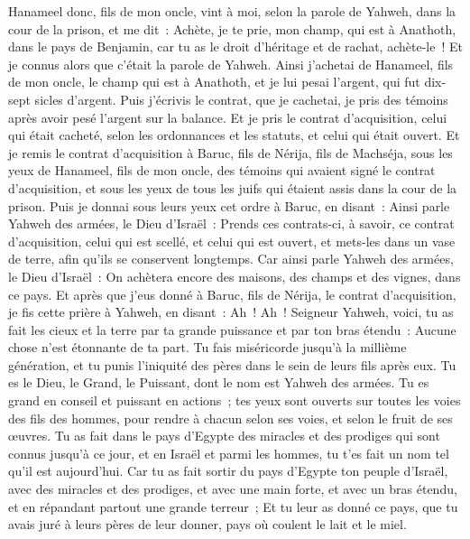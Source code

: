 \begin{multicols}{2}
Hanameel donc, fils de mon oncle, vint à moi, selon la parole de Yahweh, dans la cour de la prison, et me dit~: Achète, je te prie, mon champ, qui est à Anathoth, dans le pays de Benjamin, car tu as le droit d'héritage et de rachat, achète-le~! Et je connus alors que c'était la parole de Yahweh.
Ainsi j'achetai de Hanameel, fils de mon oncle, le champ qui est à Anathoth, et je lui pesai l'argent, qui fut dix-sept sicles d'argent.
Puis j'écrivis le contrat, que je cachetai, je pris des témoins après avoir pesé l'argent sur la balance.
Et je pris le contrat d'acquisition, celui qui était cacheté, selon les ordonnances et les statuts, et celui qui était ouvert.
Et je remis le contrat d'acquisition à Baruc, fils de Nérija, fils de Machséja, sous les yeux de Hanameel, fils de mon oncle, des témoins qui avaient signé le contrat d'acquisition, et sous les yeux de tous les juifs qui étaient assis dans la cour de la prison.
Puis je donnai sous leurs yeux cet ordre à Baruc, en disant~:
Ainsi parle Yahweh des armées, le Dieu d'Israël~: Prends ces contrats-ci, à savoir, ce contrat d'acquisition, celui qui est scellé, et celui qui est ouvert, et mets-les dans un vase de terre, afin qu'ils se conservent longtemps.
Car ainsi parle Yahweh des armées, le Dieu d'Israël~: On achètera encore des maisons, des champs et des vignes, dans ce pays.
Et après que j'eus donné à Baruc, fils de Nérija, le contrat d'acquisition, je fis cette prière à Yahweh, en disant~:
Ah~! Ah~! Seigneur Yahweh, voici, tu as fait les cieux et la terre par ta grande puissance et par ton bras étendu~: Aucune chose n'est étonnante de ta part.
Tu fais miséricorde jusqu'à la millième génération, et tu punis l'iniquité des pères dans le sein de leurs fils après eux. Tu es le Dieu, le Grand, le Puissant, dont le nom est Yahweh des armées.
Tu es grand en conseil et puissant en actions~; tes yeux sont ouverts sur toutes les voies des fils des hommes, pour rendre à chacun selon ses voies, et selon le fruit de ses œuvres.
Tu as fait dans le pays d'Egypte des miracles et des prodiges qui sont connus jusqu'à ce jour, et en Israël et parmi les hommes, tu t'es fait un nom tel qu'il est aujourd'hui.
Car tu as fait sortir du pays d'Egypte ton peuple d'Israël, avec des miracles et des prodiges, et avec une main forte, et avec un bras étendu, et en répandant partout une grande terreur~;
Et tu leur as donné ce pays, que tu avais juré à leurs pères de leur donner, pays où coulent le lait et le miel.

\end{multicols}
